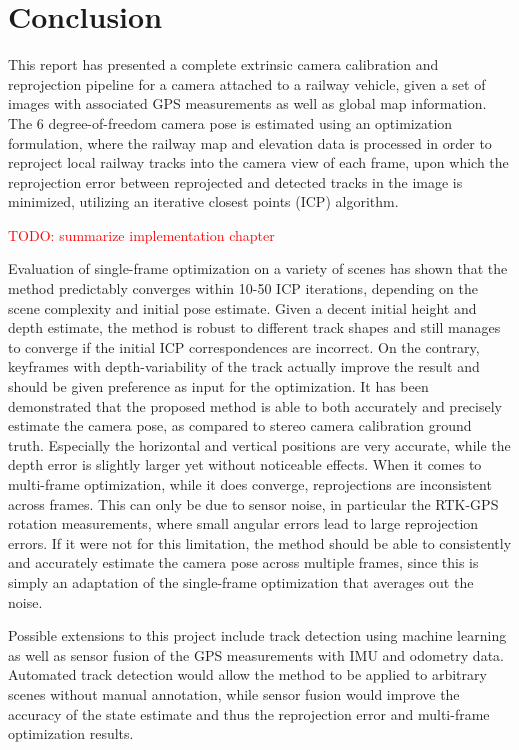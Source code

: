 \chapter{Conclusion}
\label{chapter:conclusion}

This report has presented a complete extrinsic camera calibration and reprojection pipeline for a camera attached to a railway vehicle, given a set of images with associated GPS measurements as well as global map information. The 6 degree-of-freedom camera pose is estimated using an optimization formulation, where the railway map and elevation data is processed in order to reproject local railway tracks into the camera view of each frame, upon which the reprojection error between reprojected and detected tracks in the image is minimized, utilizing an iterative closest points (ICP) algorithm.

\textcolor{red}{TODO: summarize implementation chapter}

Evaluation of single-frame optimization on a variety of scenes has shown that the method predictably converges within 10-50 ICP iterations, depending on the scene complexity and initial pose estimate. Given a decent initial height and depth estimate, the method is robust to different track shapes and still manages to converge if the initial ICP correspondences are incorrect. On the contrary, keyframes with depth-variability of the track actually improve the result and should be given preference as input for the optimization. It has been demonstrated that the proposed method is able to both accurately and precisely estimate the camera pose, as compared to stereo camera calibration ground truth. Especially the horizontal and vertical positions are very accurate, while the depth error is slightly larger yet without noticeable effects. When it comes to multi-frame optimization, while it does converge, reprojections are inconsistent across frames. This can only be due to sensor noise, in particular the RTK-GPS rotation measurements, where small angular errors lead to large reprojection errors. If it were not for this limitation, the method should be able to consistently and accurately estimate the camera pose across multiple frames, since this is simply an adaptation of the single-frame optimization that averages out the noise.

Possible extensions to this project include track detection using machine learning as well as sensor fusion of the GPS measurements with IMU and odometry data. Automated track detection would allow the method to be applied to arbitrary scenes without manual annotation, while sensor fusion would improve the accuracy of the state estimate and thus the reprojection error and multi-frame optimization results.